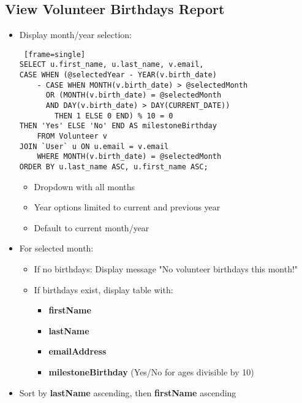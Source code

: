 \documentclass{article}
\begin{document}
\subsection{View Volunteer Birthdays Report}
\begin{itemize}
    \item Display month/year selection:
    \begin{Verbatim} [frame=single]
SELECT u.first_name, u.last_name, v.email,
CASE WHEN (@selectedYear - YEAR(v.birth_date) 
    - CASE WHEN MONTH(v.birth_date) > @selectedMonth
      OR (MONTH(v.birth_date) = @selectedMonth
      AND DAY(v.birth_date) > DAY(CURRENT_DATE)) 
        THEN 1 ELSE 0 END) % 10 = 0
THEN 'Yes' ELSE 'No' END AS milestoneBirthday 
    FROM Volunteer v
JOIN `User` u ON u.email = v.email 
    WHERE MONTH(v.birth_date) = @selectedMonth
ORDER BY u.last_name ASC, u.first_name ASC;
    \end{Verbatim}
    \begin{itemize}
        \item Dropdown with all months
        \item Year options limited to current and previous year
        \item Default to current month/year
    \end{itemize}
    \item For selected month:
    \begin{itemize}
        \item If no birthdays: Display message "No volunteer birthdays this month!"
        \item If birthdays exist, display table with:
        \begin{itemize}
            \item \textbf{firstName}
            \item \textbf{lastName}
            \item \textbf{emailAddress}
            \item \textbf{milestoneBirthday} (Yes/No for ages divisible by 10)
        \end{itemize}
    \end{itemize}
    \item Sort by \textbf{lastName} ascending, then \textbf{firstName} ascending
\end{itemize}
\end{document}
